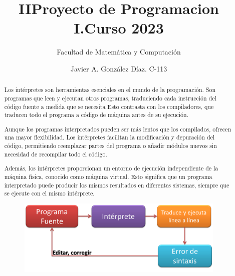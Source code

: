 \documentclass{article}%
\begin{document}
\title{IIProyecto de Programacion I.Curso 2023}
\author{Facultad de Matemática y Computación}
\date{Javier A. González Díaz.     C-113}
\maketitle

\begin{abstract}

    Los intérpretes son herramientas esenciales en el mundo de la programación. Son programas que leen y ejecutan otros programas, 
    traduciendo cada instrucción del código fuente a medida que se necesita
    Esto contrasta con los compiladores, que traducen todo el programa a código de máquina antes de su ejecución.
    
    Aunque los programas interpretados pueden ser más lentos que los compilados, ofrecen una mayor flexibilidad. Los intérpretes 
    facilitan la modificación y depuración del código, permitiendo reemplazar partes del programa o añadir módulos nuevos 
    sin necesidad de recompilar todo el código.
    
    Además, los intérpretes proporcionan un entorno de ejecución independiente de la máquina física, conocido como máquina virtual. 
    Esto significa que un programa interpretado puede producir los mismos resultados en diferentes sistemas, 
    siempre que se ejecute con el mismo intérprete.
    
    
\begin{figure}[h]
    \begin{center}
        \includegraphics*[width=10cm]{Interprete.png}
        
    \end{center}   
\end{figure}

\end{abstract}
\end{document}
